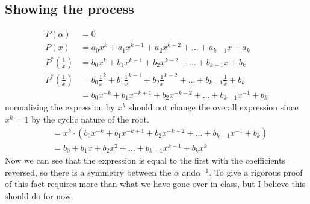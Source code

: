 \documentclass[a4paper,11pt]{exam}
\begin{document}
\subsection{Showing the process}
\label{sec:orga90ddb8}
\begin{align*}
  P(\alpha) &= 0 \\
  P(x) &= a_0x^{k} +  a_1x^{k-1} + a_2x^{k-2} + \ldots + a_{k-1}x + a_k\\
  P^*\left(\frac{1}{x}\right) &= b_0x^{k} +  b_1x^{k-1} + b_2x^{k-2} + \ldots + b_{k-1}x + b_k\\
  P^*\left(\frac{1}{x}\right) &= b_0\frac{1}{x}^{k} +  b_1\frac{1}{x}^{k-1} + b_2\frac{1}{x}^{k-2} + \ldots + b_{k-1}\frac{1}{x} + b_k \\
  &= b_0x^{-k} +  b_1x^{-k+1} + b_2x^{-k+2} + \ldots + b_{k-1}x^{-1} + b_k
  \end{align*}
  normalizing the expression by $x^k$ should not change the overall expression since $x^k = 1$ by the cyclic nature of the root.
  \begin{align*}
    &= x^k\cdot(b_0x^{-k} +  b_1x^{-k+1} + b_2x^{-k+2} + \ldots + b_{k-1}x^{-1} + b_k)\\
    &= b_0 +  b_1x + b_2x^{2} + \ldots + b_{k-1}x^{k-1} + b_kx^k 
  \end{align*}
  Now we can see that the expression is equal to the first with the coefficients reversed, so there is a symmetry between the $\alpha$ and$\alpha^{-1}$. To give a rigorous proof of this fact requires more than what we have gone over in class, but I believe this should do for now. 
\end{document}

